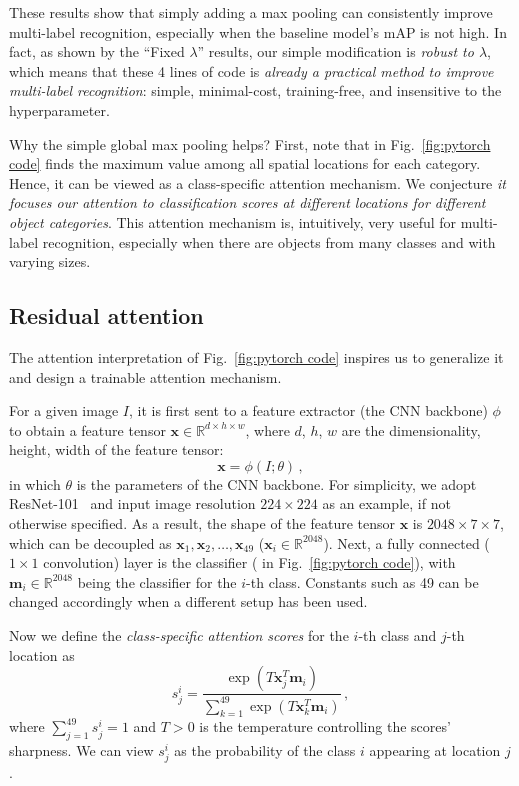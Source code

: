 \documentclass[10pt,twocolumn,letterpaper]{article}
\begin{document}
These results show that simply adding a max pooling can consistently improve multi-label recognition, especially when the baseline model's mAP is not high. In fact, as shown by the ``Fixed $\lambda$'' results, our simple modification is \emph{robust to $\lambda$}, which means that these 4 lines of code is \emph{already a practical method to improve multi-label recognition}: simple, minimal-cost, training-free, and insensitive to the hyperparameter.

Why the simple global max pooling helps? First, note that  in Fig.~\ref{fig:pytorch code} finds the maximum value among all spatial locations for each category. Hence, it can be viewed as a class-specific attention mechanism. We conjecture \emph{it focuses our attention to classification scores at different locations for different object categories}. This attention mechanism is, intuitively, very useful for multi-label recognition, especially when there are objects from many classes and with varying sizes.

\subsection{Residual attention}

The attention interpretation of Fig.~\ref{fig:pytorch code} inspires us to generalize it and design a trainable attention mechanism.

For a given image $I$, it is first sent to a feature extractor (the CNN backbone) $\phi$ to obtain a feature tensor $\mathbf{x}\in \mathbb{R}^{d\times h \times w}$, where $d$, $h$, $w$ are the dimensionality, height, width of the feature tensor:
\begin{equation}
	\mathbf{x} = \phi(I;\theta) \,,
\end{equation}
in which $\theta$ is the parameters of the CNN backbone. For simplicity, we adopt ResNet-101~\cite{ResNet} and input image resolution $224 \times 224$ as an example, if not otherwise specified. As a result, the shape of the feature tensor $\mathbf{x}$ is $2048\times7\times7$, which can be decoupled as $\mathbf{x}_1,\mathbf{x}_2,\dots,\mathbf{x}_{49}$ ($\mathbf{x}_i\in\mathbb{R}^{2048}$). Next, a fully connected ($1 \times 1$ convolution) layer is the classifier ( in Fig.~\ref{fig:pytorch code}), with $\mathbf{m}_i\in\mathbb{R}^{2048}$ being the classifier for the $i$-th class. Constants such as 49 can be changed accordingly when a different setup has been used.

Now we define the \emph{class-specific attention scores} for the $i$-th class and $j$-th location as
\begin{equation} 
	\label{eq:sij}
	s_j^i = \frac{\exp(T \mathbf{x}_j^T \mathbf{m}_i )}{\sum_{k=1}^{49} \exp(T \mathbf{x}_k^T \mathbf{m}_i) } \,,
\end{equation}
where $\sum_{j=1}^{49} s_j^i=1$ and $T>0$ is the temperature controlling the scores' sharpness. We can view $s_j^i$ as the probability of the class $i$ appearing at location $j$.
\end{document}
